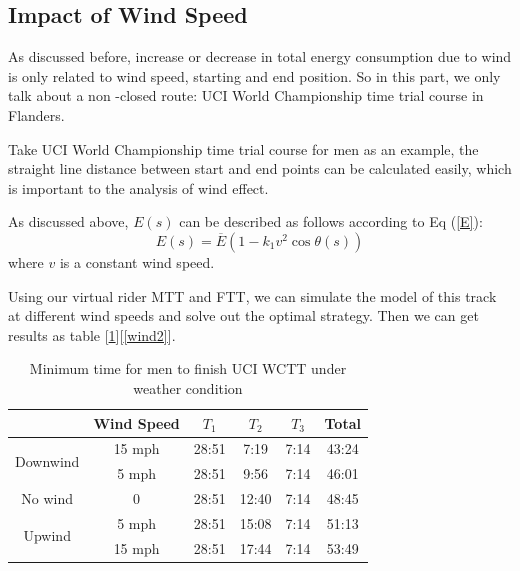 \subsection{Impact of Wind Speed}
As discussed before, increase or decrease in total energy consumption due to wind is only related to wind speed, starting and end position. So in this part, we only talk about a non -closed route: UCI World Championship time trial course in Flanders.
\par Take UCI World Championship time trial course for men as an example, the straight line distance between start and end points can be calculated easily, which is important to the analysis of wind effect.
\par As discussed above, $E(s)$ can be described as follows according to Eq (\ref{E}):
\begin{equation}
	E(s) = \overline{E}(1-k_1v^2\cos\theta(s))
\end{equation}
where $v$ is a constant wind speed. 
\par Using our virtual rider MTT and FTT, we can simulate the model of this track at different wind speeds and solve out the optimal strategy. Then we can get results as table [\ref{wind}][\ref{wind2}].
\begin{table}[h]
	\setlength\tabcolsep{13pt}%
	\setlength{\belowcaptionskip}{0.2cm}
	\centering
	\caption{Minimum time for men to finish UCI WCTT under weather condition}
	\begin{tabular}{c|ccccc}
		\toprule[2pt]
		& Wind Speed & $T_1$  & $T_2$  & $T_3$  & Total \\
		\midrule
		\multirow{2}[2]{*}{Downwind} & 15 mph    & 28:51 & 7:19  & 7:14  & 43:24 \\
		& 5 mph    & 28:51 & 9:56  & 7:14  & 46:01 \\
		\midrule
		No wind & 0     & 28:51 & 12:40 & 7:14  & 48:45 \\
		\midrule
		\multirow{2}[2]{*}{Upwind} & 5 mph     & 28:51 & 15:08 & 7:14  & 51:13 \\
		& 15 mph     & 28:51 & 17:44 & 7:14  & 53:49 \\
		\bottomrule[2pt]
	\end{tabular}%
	\label{wind}%
\end{table}%

